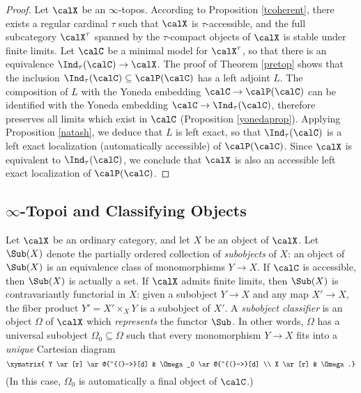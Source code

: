 \begin{proof}
Let $\calX$ be an $\infty$-topos. According to Proposition \ref{tcoherent}, there exists a regular cardinal $\tau$ such that $\calX$ is $\tau$-accessible, and the full subcategory $\calX^{\tau}$ spanned by the $\tau$-compact objects of $\calX$ is stable under finite limits.
Let $\calC$ be a minimal model for $\calX^{\tau}$, so that there is an equivalence $\Ind_{\tau}(\calC) \rightarrow \calX$. The proof of Theorem \ref{pretop} shows that 
the inclusion $\Ind_{\tau}(\calC) \subseteq \calP(\calC)$ has a left adjoint $L$. 
The composition of $L$ with the Yoneda embedding $\calC \rightarrow \calP(\calC)$ can be identified with the Yoneda embedding $\calC \rightarrow \Ind_{\tau}(\calC)$, therefore preserves all limits which exist in $\calC$ (Proposition \ref{yonedaprop}). Applying Proposition \ref{natash}, we deduce that $L$ is left exact, so that $\Ind_{\tau}(\calC)$ is a left exact localization (automatically accessible) of $\calP(\calC)$. Since $\calX$ is equivalent to $\Ind_{\tau}(\calC)$, we conclude that
$\calX$ is also an accessible left exact localization of $\calP(\calC)$.
\end{proof}

\subsection{$\infty$-Topoi and Classifying Objects}\label{rezk2}

Let $\calX$ be an ordinary category, and let $X$ be an object of $\calX$. Let $\Sub(X)$
denote the partially ordered collection of {\it subobjects} of $X$: an object of $\Sub(X)$ is an equivalence class of monomorphisms $Y \rightarrow X$. If $\calC$ is accessible, then $\Sub(X)$ is actually a set. If $\calX$ admits finite limits, then $\Sub(X)$ is contravariantly functorial in $X$:
given a subobject $Y \rightarrow X$ and any map $X' \rightarrow X$, the fiber product
$Y' = X' \times_{X} Y$ is a subobject of $X'$. A {\it subobject classifier} is an object $\Omega$ of $\calX$ which {\em represents} the functor $\Sub$. In other words, $\Omega$ has a universal subobject 
$\Omega_0 \subseteq \Omega$ such that every monomorphism $Y \rightarrow X$ fits into a {\em unique} Cartesian diagram
$$ \xymatrix{ Y \ar[r] \ar@{^{(}->}[d] & \Omega_0 \ar@{^{(}->}[d] \\
X \ar[r] & \Omega.}$$
(In this case, $\Omega_0$ is automatically a final object of $\calC$.)

